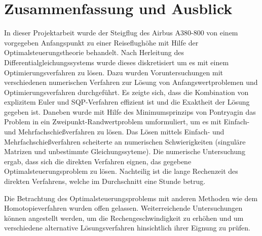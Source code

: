 \chapter{Zusammenfassung und Ausblick}

In dieser Projektarbeit wurde der Steigflug des Airbus A380-800 von einem vorgegeben Anfangspunkt zu einer Reiseflughöhe mit Hilfe der Optimalsteuerungstheorie behandelt.  Nach Herleitung des Differentialgleichungssystems wurde dieses diskretisiert um es mit einem Optimierungsverfahren zu lösen. Dazu wurden Voruntersuchungen mit verschiedenen numerischen Verfahren zur Lösung von Anfangswertproblemen und Optimierungsverfahren durchgeführt. Es zeigte sich, dass die Kombination von explizitem Euler und SQP-Verfahren effizient ist und die Exaktheit der Lösung gegeben ist. Daneben wurde mit Hilfe des Minimumsprinzips von Pontryagin das Problem in ein Zweipunkt-Randwertproblem umformuliert, um es mit Einfach- und Mehrfachschießverfahren zu lösen. Das Lösen mittels Einfach- und Mehrfachschießverfahren scheiterte an numerischen Schwierigkeiten (singuläre Matrizen und unbestimmte Gleichungssyteme). Die numerische Untersuchung ergab, dass sich die direkten Verfahren eignen, das gegebene Optimalsteuerungsproblem zu lösen.  Nachteilig ist die lange Rechenzeit des direkten Verfahrens, welche im Durchschnitt eine Stunde betrug. 

Die Betrachtung des Optimalsteuerungsproblems mit anderen Methoden wie dem Homotopieverfahren wurden offen gelassen. Weiterreichende Untersuchungen können angestellt werden, um die Rechengeschwindigkeit zu erhöhen und um verschiedene alternative Lösungsverfahren hinsichtlich ihrer Eignung zu prüfen.